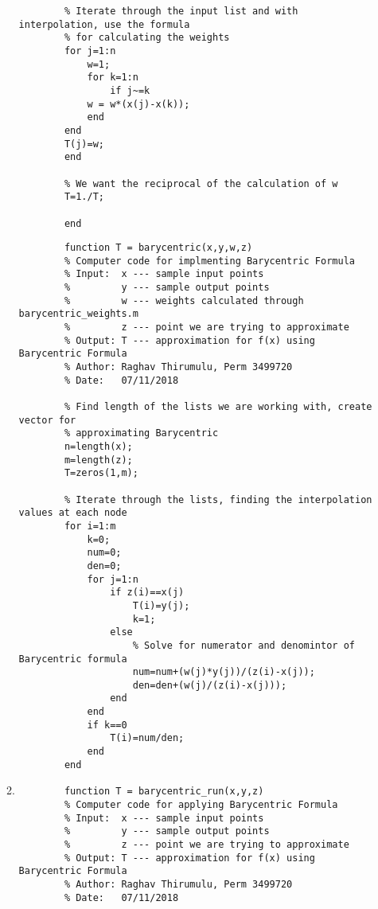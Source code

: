 \documentclass{article}
\begin{document}
\begin{enumerate}
\begin{enumerate}
\begin{lstlisting}
        % Iterate through the input list and with interpolation, use the formula 
        % for calculating the weights
        for j=1:n
            w=1;
            for k=1:n
                if j~=k
            w = w*(x(j)-x(k));
            end
        end
        T(j)=w; 
        end

        % We want the reciprocal of the calculation of w
        T=1./T;

        end
        \end{lstlisting}
        
        \begin{lstlisting}
        function T = barycentric(x,y,w,z)
        % Computer code for implmenting Barycentric Formula
        % Input:  x --- sample input points
        %         y --- sample output points
        %         w --- weights calculated through barycentric_weights.m
        %         z --- point we are trying to approximate  
        % Output: T --- approximation for f(x) using Barycentric Formula
        % Author: Raghav Thirumulu, Perm 3499720
        % Date:   07/11/2018

        % Find length of the lists we are working with, create vector for
        % approximating Barycentric
        n=length(x);
        m=length(z);
        T=zeros(1,m);

        % Iterate through the lists, finding the interpolation values at each node
        for i=1:m
            k=0;
            num=0;
            den=0;
            for j=1:n
                if z(i)==x(j)
                    T(i)=y(j);
                    k=1;
                else
                    % Solve for numerator and denomintor of Barycentric formula
                    num=num+(w(j)*y(j))/(z(i)-x(j));
                    den=den+(w(j)/(z(i)-x(j)));
                end
            end
            if k==0
                T(i)=num/den;
            end
        end
        \end{lstlisting}
        
        \item
        \begin{lstlisting}
        function T = barycentric_run(x,y,z)
        % Computer code for applying Barycentric Formula
        % Input:  x --- sample input points
        %         y --- sample output points
        %         z --- point we are trying to approximate  
        % Output: T --- approximation for f(x) using Barycentric Formula
        % Author: Raghav Thirumulu, Perm 3499720
        % Date:   07/11/2018


\end{lstlisting}
\end{enumerate}
\end{enumerate}
\end{document}
